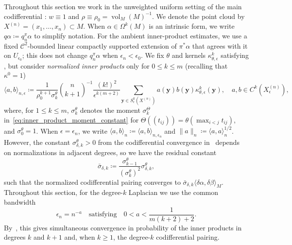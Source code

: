 \documentclass[11pt,reqno]{amsproc}
\numberwithin{equation}{section}
\newcommand{\by}{\mathbf{y}}
\newcommand{\cC}{\mathcal{C}}
\newcommand{\vol}{\operatorname{vol}}
\theoremstyle{definition}
\theoremstyle{plain}
\begin{document}
    Throughout this section we work in the unweighted uniform setting of the main codifferential : $w\equiv 1$ and $\rho\equiv\rho_0=\vol_M(M)^{-1}$. We denote the point cloud by $X^{(n)}=(x_1,\ldots,x_n)\subset M$.  When $\alpha \in \Omega^k(M)$ is an intrinsic form, we write $q \alpha \coloneq q_n^\pi \alpha$ to simplify notation. For the ambient inner-product estimates, we use a fixed $\cC^2$-bounded linear compactly supported extension of $\pi^*\alpha$ that agrees with it on $U_{\epsilon_0}$; this does not change $q_n^\pi\alpha$ when $\epsilon_n<\epsilon_0$. We fix $\theta$ and kernels $\kappa^k_{\theta, \epsilon}$ satisfying , but consider \emph{normalized inner products} \label{not:normalized_inner_products} only for $0\leq k\leq m$ (recalling that $\kappa^0 = 1$)
    \begin{equation}
        \langle a, b \rangle_{n,\epsilon} \coloneqq  \frac{1}{\rho_0^{k+1} \sigma_k^\theta}\binom{n}{k+1}^{-1} \frac{(k!)^2}{\epsilon^{k(m+2)}}\sum_{\by \in S^k_\epsilon(X^{(n)})} a(\by) b(\by)  \kappa^k_{\theta,\epsilon}(\by) , \quad a,b \in C^k(X^{(n)}_\epsilon),
    \end{equation}
    where, for $1\leq k\leq m$, $\sigma_k^\theta$ denotes the moment $\sigma_k^\Theta$ in~\eqref{eq:inner_product_moment_constant} for $\Theta((t_{ij}))=\theta(\max_{i<j}t_{ij})$, and $\sigma_0^\theta=1$.
    When $\epsilon=\epsilon_n$, we write $\langle a,b\rangle_n\coloneqq\langle a,b\rangle_{n,\epsilon_n}$ and $\|a\|_n\coloneqq\langle a,a\rangle_n^{1/2}$.
    However, the constant $\sigma^\theta_{\delta,k}>0$ from the codifferential convergence in~ depends on normalizations in adjacent degrees, so we have the residual constant
    \begin{equation} \label{eq:residual_codiff_constant}
        \bar{\sigma}_{\delta,k} \coloneqq \frac{\sigma^\theta_{k-1}}{(\sigma^\theta_k)^2} \sigma^\theta_{\delta,k},
    \end{equation}
    such that the normalized codifferential pairing converges to $\bar{\sigma}_{\delta,k} \langle \delta \alpha, \delta \beta \rangle_M$.
    Throughout this section, for the degree-$k$ Laplacian we use the common bandwidth
    \begin{equation} \label{eq:combined_bandwidth}
        \epsilon_n=n^{-a} \quad \text{satisfying} \quad 0<a<\frac{1}{m(k+2)+2}.
    \end{equation}
    By~, this gives simultaneous convergence in probability of the inner products in degrees $k$ and $k+1$ and, when $k\geq1$, the degree-$k$ codifferential pairing. 
\end{document}
